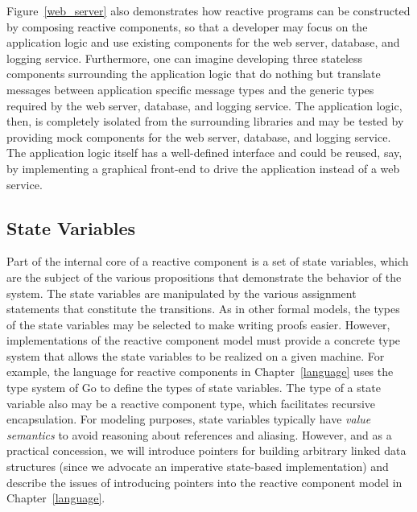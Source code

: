 Figure~\ref{web_server} also demonstrates how reactive programs can be constructed by composing reactive components, so that a developer may focus on the application logic and use existing components for the web server, database, and logging service.
Furthermore, one can imagine developing three stateless components surrounding the application logic that do nothing but translate messages between application specific message types and the generic types required by the web server, database, and logging service.
The application logic, then, is completely isolated from the surrounding libraries and may be tested by providing mock components for the web server, database, and logging service.
The application logic itself has a well-defined interface and could be reused, say, by implementing a graphical front-end to drive the application instead of a web service.

\subsection{State Variables}
Part of the internal core of a reactive component is a set of state variables, which are the subject of the various propositions that demonstrate the behavior of the system.
The state variables are manipulated by the various assignment statements that constitute the transitions.
As in other formal models, the types of the state variables may be selected to make writing proofs easier.
However, implementations of the reactive component model must provide a concrete type system that allows the state variables to be realized on a given machine.
For example, the language for reactive components in Chapter~\ref{language} uses the type system of Go to define the types of state variables.
The type of a state variable also may be a reactive component type, which facilitates recursive encapsulation.
For modeling purposes, state variables typically have \emph{value semantics} to avoid reasoning about references and aliasing.
However, and as a practical concession, we will introduce pointers for building arbitrary linked data structures (since we advocate an imperative state-based implementation) and describe the issues of introducing pointers into the reactive component model in Chapter~\ref{language}.

